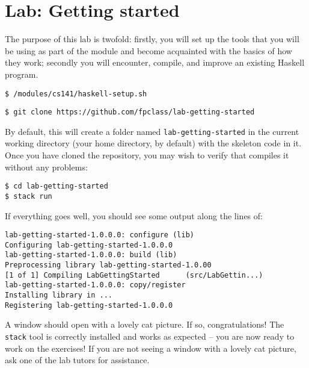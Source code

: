 \section{Lab: Getting started}

The purpose of this lab is twofold: firstly, you will set up the tools that you will be using as part of the module and become acquainted with the basics of how they work; secondly you will encounter, compile, and improve an existing Haskell program.


\begin{verbatim}
$ /modules/cs141/haskell-setup.sh
\end{verbatim}

\taskLine

\begin{verbatim}
$ git clone https://github.com/fpclass/lab-getting-started
\end{verbatim}
By default, this will create a folder named \texttt{\small lab-getting-started} in the current working directory (your home directory, by default) with the skeleton code in it. Once you have cloned the repository, you may wish to verify that  compiles it without any problems:
\begin{verbatim}
$ cd lab-getting-started
$ stack run
\end{verbatim}
If everything goes well, you should see some output along the lines of:
\begin{verbatim}
lab-getting-started-1.0.0.0: configure (lib)
Configuring lab-getting-started-1.0.0.0
lab-getting-started-1.0.0.0: build (lib)
Preprocessing library lab-getting-started-1.0.00
[1 of 1] Compiling LabGettingStarted      (src/LabGettin...)
lab-getting-started-1.0.0.0: copy/register
Installing library in ...
Registering lab-getting-started-1.0.0.0
\end{verbatim}
A window should open with a lovely cat picture. If so, congratulations! The \texttt{\small stack} tool is correctly installed and works as expected -- you are now ready to work on the exercises! If you are not seeing a window with a lovely cat picture, ask one of the lab tutors for assistance.

